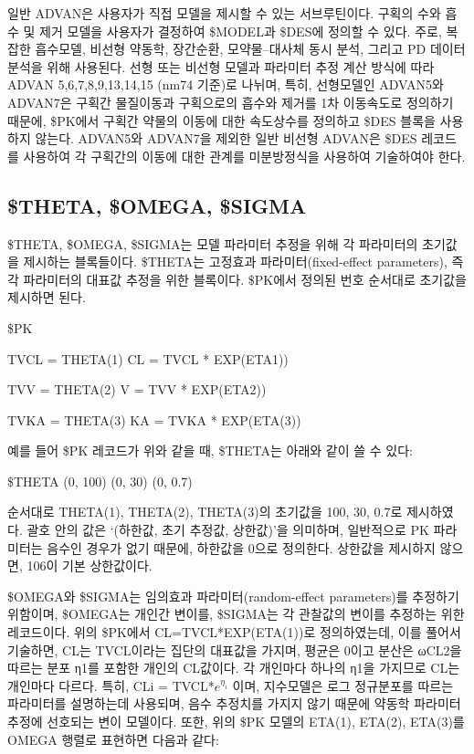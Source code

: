 \documentclass[
  10pt,
]{krantz}
\begin{document}
일반 ADVAN은 사용자가 직접 모델을 제시할 수 있는 서브루틴이다. 구획의 수와 흡수 및 제거 모델을 사용자가 결정하여
\$MODEL과 \$DES에 정의할 수 있다. 주로, 복잡한 흡수모델, 비선형 약동학, 장간순환, 모약물--대사체 동시 분석, 그리고
PD 데이터 분석을 위해 사용된다. 선형 또는 비선형 모델과 파라미터 추정 계산 방식에 따라 ADVAN
5,6,7,8,9,13,14,15 (nm74 기준)로 나뉘며, 특히, 선형모델인 ADVAN5와 ADVAN7은 구획간 물질이동과
구획으로의 흡수와 제거를 1차 이동속도로 정의하기 때문에, \$PK에서 구획간 약물의 이동에 대한 속도상수를 정의하고
\$DES 블록을 사용하지 않는다. ADVAN5와 ADVAN7을 제외한 일반 비선형 ADVAN은 \$DES 레코드를 사용하여 각
구획간의 이동에 대한 관계를 미분방정식을 사용하여 기술하여야 한다.

\hypertarget{theta-omega-sigma}{%
\subsection{\$THETA, \$OMEGA, \$SIGMA}\label{theta-omega-sigma}}

\$THETA, \$OMEGA, \$SIGMA는 모델 파라미터 추정을 위해 각 파라미터의 초기값을 제시하는 블록들이다. \$THETA는
고정효과 파라미터(fixed-effect parameters), 즉 각 파라미터의 대표값 추정을 위한 블록이다. \$PK에서
정의된 번호 순서대로 초기값을 제시하면 된다.

\$PK

TVCL = THETA(1) CL = TVCL * EXP(ETA1))

TVV = THETA(2) V = TVV * EXP(ETA2))

TVKA = THETA(3) KA = TVKA * EXP(ETA(3))

예를 들어 \$PK 레코드가 위와 같을 때, \$THETA는 아래와 같이 쓸 수 있다:

\$THETA (0, 100) (0, 30) (0, 0.7)

순서대로 THETA(1), THETA(2), THETA(3)의 초기값을 100, 30, 0.7로 제시하였다. 괄호 안의 값은
`(하한값, 초기 추정값, 상한값)'을 의미하며, 일반적으로 PK 파라미터는 음수인 경우가 없기 때문에, 하한값을 0으로
정의한다. 상한값을 제시하지 않으면, 106이 기본 상한값이다.

\$OMEGA와 \$SIGMA는 임의효과 파라미터(random-effect parameters)를 추정하기 위함이며, \$OMEGA는
개인간 변이를, \$SIGMA는 각 관찰값의 변이를 추정하는 위한 레코드이다. 위의 \$PK에서
CL=TVCL*EXP(ETA(1))로 정의하였는데, 이를 풀어서 기술하면, CL는 TVCL이라는 집단의 대표값을 가지며, 평균은
0이고 분산은 ωCL2을 따르는 분포 η1를 포함한 개인의 CL값이다.
각 개인마다 하나의 η1을 가지므로 CL는 개인마다 다르다. 특히, CLi =
TVCL*\(e^{\eta_{i}}\) 이며, 지수모델은 로그 정규분포를 따르는 파라미터를 설명하는데 사용되며, 음수 추정치를
가지지 않기 때문에 약동학 파라미터 추정에 선호되는 변이 모델이다. 또한, 위의 \$PK 모델의 ETA(1), ETA(2),
ETA(3)를 OMEGA 행렬로 표현하면 다음과 같다:
\end{document}
